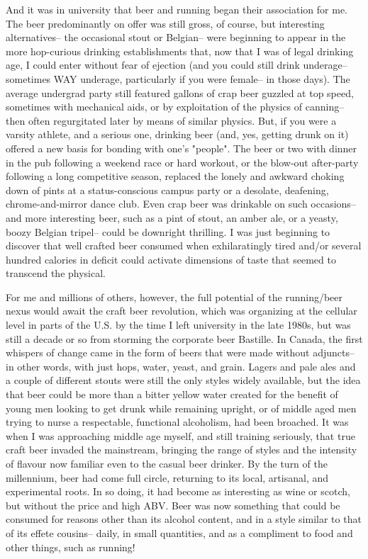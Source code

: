 And it was in university that beer and running began their association for me. The beer predominantly on offer was still gross, of course, but interesting alternatives-- the occasional stout or Belgian-- were beginning to appear in the more hop-curious drinking establishments that, now that I was of legal drinking age, I could enter without fear of ejection (and you could still drink underage-- sometimes WAY underage, particularly if you were female-- in those days). The average undergrad party still featured gallons of crap beer guzzled at top speed, sometimes with mechanical aids, or by exploitation of the physics of canning-- then often regurgitated later by means of similar physics. But, if you were a varsity athlete, and a serious one, drinking beer (and, yes, getting drunk on it) offered a new basis for bonding with one's "people". The beer or two with dinner in the pub following a weekend race or hard workout, or the blow-out after-party following a long competitive season, replaced the lonely and awkward choking down of pints at a status-conscious campus party or a desolate, deafening, chrome-and-mirror dance club. Even crap beer was drinkable on such occasions-- and more interesting beer, such as a pint of stout, an amber ale, or a yeasty, boozy Belgian tripel-- could be downright thrilling. I was just beginning to discover that well crafted beer consumed when exhilaratingly tired and/or several hundred calories in deficit could activate dimensions of taste that seemed to transcend the physical.

For me and millions of others, however, the full potential of the running/beer nexus would await the craft beer revolution, which was organizing at the cellular level in parts of the U.S. by the time I left university in the late 1980s, but was still a decade or so from storming the corporate beer Bastille. In Canada, the first whispers of change came in the form of beers that were made without adjuncts-- in other words, with just hops, water, yeast, and grain. Lagers and pale ales and a couple of different stouts were still the only styles widely available, but the idea that beer could be more than a bitter yellow water created for the benefit of young men looking to get drunk while remaining upright, or of middle aged men trying to nurse a respectable, functional alcoholism, had been broached. It was when I was approaching middle age myself, and still training seriously, that true craft beer invaded the mainstream, bringing the range of styles and the intensity of flavour now familiar even to the casual beer drinker. By the turn of the millennium, beer had come full circle, returning to its local, artisanal, and experimental roots. In so doing, it had become as interesting as wine or scotch, but without the price and high ABV. Beer was now something that could be consumed for reasons other than its alcohol content, and in a style similar to that of its effete cousins-- daily, in small quantities, and as a compliment to food and other things, such as running!

